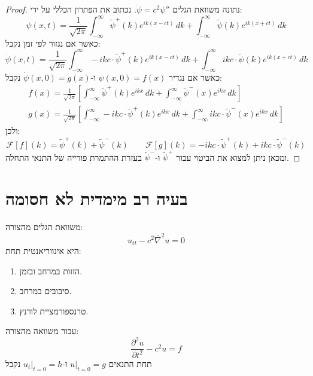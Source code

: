 \documentclass{tstextbook}
\begin{document}
\begin{proof}
נתונה משוואת הגלים \(\ddot{\psi}=c^{2}\psi''\). נכתוב את הפתרון הכללי על ידי:
$$\psi(x,t)=\frac{1}{\sqrt{ 2\pi }} \int_{-\infty}^{\infty} \tilde{\psi}^{+}(k) e^{ ik(x-ct) } \, dk + \int_{-\infty}^{\infty} \tilde{\psi}(k) e^{ ik(x+ct) }\, dk  $$
כאשר אם נגזור לפי זמן נקבל:
$$\dot{\psi}(x,t)=\frac{1}{\sqrt{ 2\pi }} \int_{-\infty}^{\infty} -ikc \cdot\tilde{\psi}^{+}(k) e^{ ik(x-ct) } \, dk + \int_{-\infty}^{\infty} ikc\cdot\tilde{\psi}(k) e^{ ik(x+ct) }\, dk  $$
כאשר אם נגדיר \(\psi(x,0)=f(x)\) ו-\(\dot{\psi}(x,0)=g(x)\) נקבל:
\begin{gather*}f(x)=\frac{1}{\sqrt{ 2\pi }}\left[ \int_{-\infty}^{\infty} \tilde{\psi}^{+}(k)e^{ ikx } \, dk + \int_{-\infty}^{\infty} \tilde{\psi}^{-}(x)e^{ ikx } \, dk  \right]  \\g(x)=\frac{1}{\sqrt{ 2\pi }}\left[ \int_{-\infty}^{\infty} -ikc\cdot\tilde{\psi}^{+}(k)e^{ ikx } \, dk + \int_{-\infty}^{\infty} ikc\cdot \tilde{\psi}^{-}(x)e^{ ikx } \, dk  \right] 
\end{gather*}
ולכן:
$$\mathcal{F} [f](k)= \tilde{\psi}^{+}(k)+\tilde{\psi}^{-}(k) \qquad \mathcal{F} [g] (k)=-ikc \cdot\tilde{\psi}^{+}(k) + ikc \cdot \tilde{\psi}^{-}(k)
$$
ומכאן ניתן למצוא את הביטוי עבור \(\tilde{\psi}^{+}\) ו-\(\tilde{\psi}^{-}\) בעזרת ההתמרת פורייה של התנאי התחלה.

\end{proof}
\section{בעיה רב מימדית לא חסומה}

\begin{proposition}
משוואת הגלים מהצורה:
$$u_{tt}-c^{2}\bar{\nabla}^2 u=0$$
היא אינווריאנטית תחת:

  \begin{enumerate}
    \item הזזות במרחב ובזמן. 


    \item סיבובים במרחב. 


    \item טרנספורמציית לורנץ. 


  \end{enumerate}
\end{proposition}
\begin{proposition}
עבור משוואה מהצורה:
$$\frac{\partial ^2u}{\partial t^{2}}-c^{2}u=f $$
תחת התנאים \(u|_{t=0}=g\) ו-\(u_{t}|_{t=0}=h\) נקבל

\end{proposition}
\end{document}
